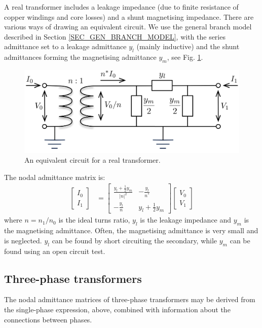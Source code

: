 \documentclass[11pt]{article}
\begin{document}
A real transformer includes a leakage impedance (due to finite resistance of copper windings and core losses) and a shunt magnetising impedance. There are various ways of drawing an equivalent circuit. We use the general branch model described in Section \ref{SEC_GEN_BRANCH_MODEL}, with the series admittance set to a leakage admittance $y_l$ (mainly inductive) and the shunt admittances forming the magnetising admittance $y_m$, see Fig. \ref{FIG_REAL_TRANS}.
\begin{figure}[!h]
	\begin{center}
		\includegraphics[width=(\textwidth-2cm)]{transformer.png}
	\end{center}
	\caption{
		An equivalent circuit for a real transformer.
	}
	\label{FIG_REAL_TRANS}
\end{figure}

The nodal admittance matrix is:
\begin{align}
\begin{bmatrix}I_0 \\ I_1 \end{bmatrix} &= 
\begin{bmatrix}\frac{y_l + \frac{1}{2}y_m}{|n|^2} & -\frac{y_l}{n^*} \\ -\frac{y_l}{n} & y_l + \frac{1}{2}y_m\end{bmatrix}
\begin{bmatrix}V_0 \\ V_1 \end{bmatrix}
\label{EQ_REAL_TRANS}
\end{align}
where $n = n_1/n_0$ is the ideal turns ratio, $y_l$ is the leakage impedance and $y_m$ is the magnetising admittance. Often, the magnetising admittance is very small and is neglected. $y_l$ can be found by short circuiting the secondary, while $y_m$ can be found using an open circuit test.

\subsection{Three-phase transformers}
The nodal admittance matrices of three-phase transformers may be derived from the single-phase expression, above, combined with information about the connections between phases.
\end{document}
